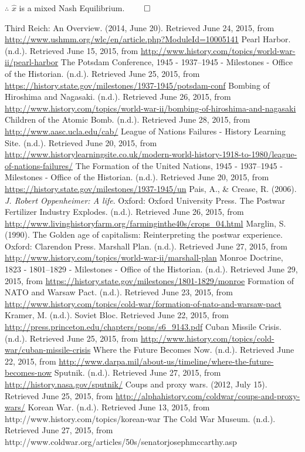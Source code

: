 \documentclass[12pt]{article}
\begin{document}
$\therefore$ $\hat{x}$ is a mixed Nash Equilibrium.
$\qed$


\newpage
\begin{thebibliography}{10}
 Third Reich: An Overview. (2014, June 20). Retrieved June 24, 2015, from \url{http://www.ushmm.org/wlc/en/article.php?ModuleId=10005141}
 Pearl Harbor. (n.d.). Retrieved June 15, 2015, from \url{http://www.history.com/topics/world-war-ii/pearl-harbor}
 The Potsdam Conference, 1945 - 1937–1945 - Milestones - Office of the Historian. (n.d.). Retrieved June 25, 2015, from \url{https://history.state.gov/milestones/1937-1945/potsdam-conf}
 Bombing of Hiroshima and Nagasaki. (n.d.). Retrieved June 26, 2015, from \url{http://www.history.com/topics/world-war-ii/bombing-of-hiroshima-and-nagasaki}
 Children of the Atomic Bomb. (n.d.). Retrieved June 28, 2015, from \url{http://www.aasc.ucla.edu/cab/}
 League of Nations Failures - History Learning Site. (n.d.). Retrieved June 20, 2015, from \url{http://www.historylearningsite.co.uk/modern-world-history-1918-to-1980/league-of-nations-failures/}
 The Formation of the United Nations, 1945 - 1937–1945 - Milestones - Office of the Historian. (n.d.). Retrieved June 20, 2015, from \url{https://history.state.gov/milestones/1937-1945/un}
 Pais, A., \& Crease, R. (2006). \textit{J. Robert Oppenheimer: A life}. Oxford: Oxford University Press. 
 The Postwar Fertilizer Industry Explodes. (n.d.). Retrieved June 26, 2015, from \url{http://www.livinghistoryfarm.org/farminginthe40s/crops\_04.html}
 Marglin, S. (1990). The Golden age of capitalism: Reinterpreting the postwar experience. Oxford: Clarendon Press.
 Marshall Plan. (n.d.). Retrieved June 27, 2015, from \url{http://www.history.com/topics/world-war-ii/marshall-plan}
 Monroe Doctrine, 1823 - 1801–1829 - Milestones - Office of the Historian. (n.d.). Retrieved June 29, 2015, from \url{https://history.state.gov/milestones/1801-1829/monroe}
 Formation of NATO and Warsaw Pact. (n.d.). Retrieved June 23, 2015, from \url{http://www.history.com/topics/cold-war/formation-of-nato-and-warsaw-pact}
 Kramer, M. (n.d.). Soviet Bloc. Retrieved June 22, 2015, from \url{http://press.princeton.edu/chapters/pons/s6\_9143.pdf}
 Cuban Missile Crisis. (n.d.). Retrieved June 25, 2015, from \url{http://www.history.com/topics/cold-war/cuban-missile-crisis}
 Where the Future Becomes Now. (n.d.). Retrieved June 22, 2015, from \url{http://www.darpa.mil/about-us/timeline/where-the-future-becomes-now}
 Sputnik. (n.d.). Retrieved June 27, 2015, from \url{http://history.nasa.gov/sputnik/}
 Coups and proxy wars. (2012, July 15). Retrieved June 25, 2015, from \url{http://alphahistory.com/coldwar/coups-and-proxy-wars/}
 Korean War. (n.d.). Retrieved June 13, 2015, from {http://www.history.com/topics/korean-war}
 The Cold War Museum. (n.d.). Retrieved June 27, 2015, from {http://www.coldwar.org/articles/50s/senatorjosephmccarthy.asp}


\end{thebibliography}
\end{document}
